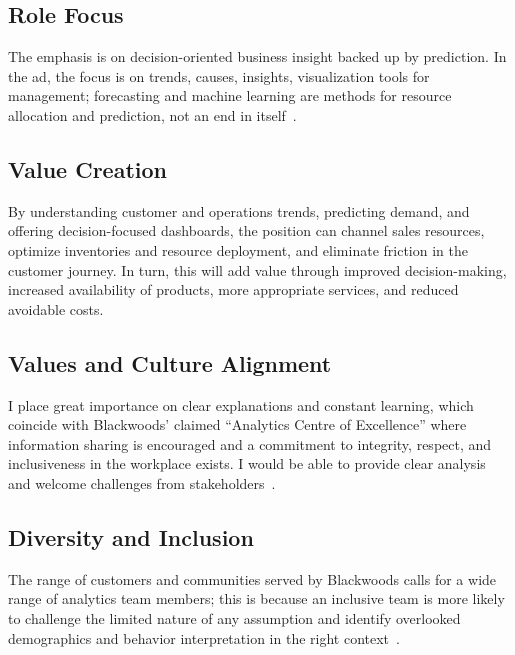 

\subsection{Role Focus}
\label{subsec:Role Focus}

The emphasis is on decision-oriented business insight backed up by prediction. In the ad, the focus is on trends, causes, insights, visualization tools for management; forecasting and machine learning are methods for resource allocation and prediction, not an end in itself~\cite{blackwoods2026job}.



\subsection{Value Creation}
\label{subsec:Value Creation}

By understanding customer and operations trends, predicting demand, and offering decision-focused dashboards, the position can channel sales resources, optimize inventories and resource deployment, and eliminate friction in the customer journey. In turn, this will add value through improved decision-making, increased availability of products, more appropriate services, and reduced avoidable costs.



\subsection{Values and Culture Alignment}
\label{subsec:Values and Culture Alignment}

I place great importance on clear explanations and constant learning, which coincide with Blackwoods’ claimed “Analytics Centre of Excellence” where information sharing is encouraged and a commitment to integrity, respect, and inclusiveness in the workplace exists. I would be able to provide clear analysis and welcome challenges from stakeholders~\cite{blackwoods2024sustainability}.



\subsection{Diversity and Inclusion}
\label{subsec:Diversity and Inclusion}

The range of customers and communities served by Blackwoods calls for a wide range of analytics team members; this is because an inclusive team is more likely to challenge the limited nature of any assumption and identify overlooked demographics and behavior interpretation in the right context~\cite{wesfarmers2022diversity}.

